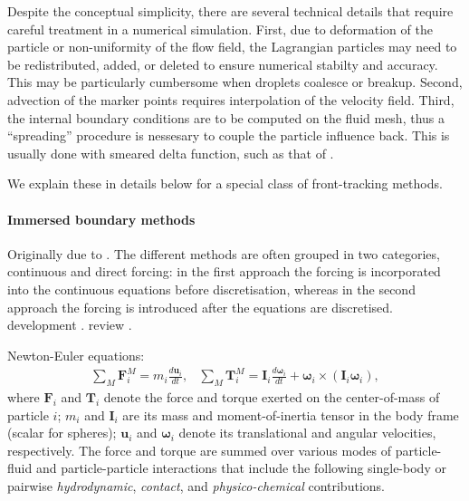 Despite the conceptual simplicity, there are several technical details that require careful treatment in a numerical simulation.
First, due to deformation of the particle or non-uniformity of the flow field, the Lagrangian particles may need to be redistributed, added, or deleted to ensure numerical stabilty and accuracy.
This may be particularly cumbersome when droplets coalesce or breakup.
Second, advection of the marker points requires interpolation of the velocity field.
Third, the internal boundary conditions are to be computed on the fluid mesh, thus a ``spreading'' procedure is nessesary to couple the particle influence back. This is usually done with smeared delta function, such as that of \cite{Peskin}.

We explain these in details below for a special class of front-tracking methods.

\medskip
\paragraph{\bf Immersed boundary methods}

Originally due to \cite{Peskin}.
The different methods are often grouped in two categories, continuous and direct forcing: in the first approach the forcing is incorporated into the continuous equations before discretisation, whereas in the second approach the forcing is introduced after the equations are discretised. 
development \citep{fadlun_verzicco_orlandi_mohd-yusof_2000a, Uhlmann, pinelli_naqavi_piomelli_favier_2010a, Wim-Paul_JCP_2012, favier_revell_pinelli_2014a}.
review \citep{mittal_iaccarino_2005a}.

Newton-Euler equations:
\begin{subequations} \label{eq:newton-euler}
  \begin{equation} 
    \begin{aligned} \label{eq:force-balance}
      \sum_M {\bm F}_i^M = m_i \frac{d{\bm u}_i}{dt}, 
    \end{aligned}
  \end{equation}
  \begin{equation} 
    \begin{aligned}
      \sum_M {\bm T}_i^M = {\bm I}_i \frac{d{\bm \omega}_i}{dt} + {\bm \omega}_i\times({\bm I}_i{\bm \omega}_i),
    \end{aligned}
  \end{equation}
\end{subequations}
where ${\bm F}_i$ and ${\bm T}_i$ denote the force and torque exerted on the center-of-mass of particle $i$; $m_i$ and ${\bm I}_i$ are its mass and moment-of-inertia tensor in the body frame (scalar for spheres); ${\bm u}_i$ and ${\bm \omega}_i$ denote its translational and angular velocities, respectively. The force and torque are summed over various modes of particle-fluid and particle-particle interactions that include the following single-body or pairwise \emph{hydrodynamic}, \emph{contact}, and \emph{physico-chemical} contributions.



